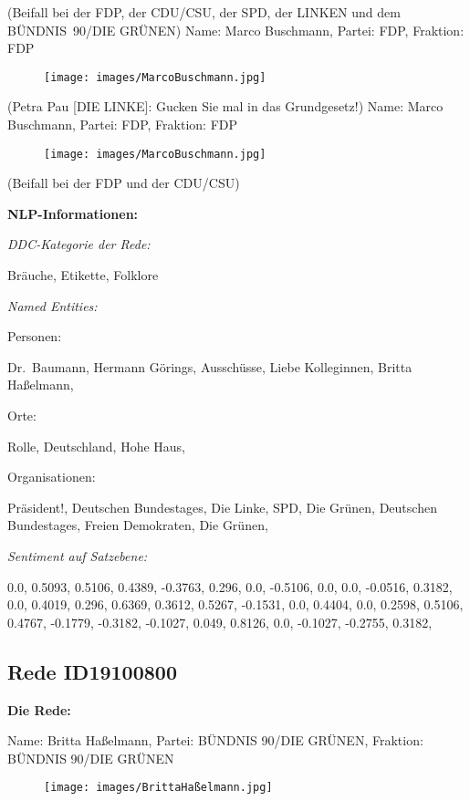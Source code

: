 \documentclass[10pt, a4paper]{report}
\begin{document}
(Beifall bei der FDP, der CDU/CSU, der SPD, der LINKEN und dem BÜNDNIS 90/DIE GRÜNEN)
Name: Marco Buschmann, Partei: FDP, Fraktion: FDP

\begin{figure}[!ht]
\texttt{[image: images/MarcoBuschmann.jpg]}
\end{figure}


(Petra Pau [DIE LINKE]: Gucken Sie mal in das Grundgesetz!)
Name: Marco Buschmann, Partei: FDP, Fraktion: FDP

\begin{figure}[!ht]
\texttt{[image: images/MarcoBuschmann.jpg]}
\end{figure}


(Beifall bei der FDP und der CDU/CSU)


\textbf{NLP-Informationen:}

\textit{DDC-Kategorie der Rede:}

Bräuche, Etikette, Folklore

\textit{Named Entities:}

Personen:

Dr. Baumann, Hermann Görings, Ausschüsse, Liebe Kolleginnen, Britta Haßelmann, 

Orte:

Rolle, Deutschland, Hohe Haus, 

Organisationen:

Präsident!, Deutschen Bundestages, Die Linke, SPD, Die Grünen, Deutschen Bundestages, Freien Demokraten, Die Grünen, 

\textit{Sentiment auf Satzebene:}

0.0, 0.5093, 0.5106, 0.4389, -0.3763, 0.296, 0.0, -0.5106, 0.0, 0.0, -0.0516, 0.3182, 0.0, 0.4019, 0.296, 0.6369, 0.3612, 0.5267, -0.1531, 0.0, 0.4404, 0.0, 0.2598, 0.5106, 0.4767, -0.1779, -0.3182, -0.1027, 0.049, 0.8126, 0.0, -0.1027, -0.2755, 0.3182, 
\subsection{Rede ID19100800}

\textbf{Die Rede:}

Name: Britta Haßelmann, Partei: BÜNDNIS 90/DIE GRÜNEN, Fraktion: BÜNDNIS 90/DIE GRÜNEN

\begin{figure}[!ht]
\texttt{[image: images/BrittaHaßelmann.jpg]}
\end{figure}
\end{document}
